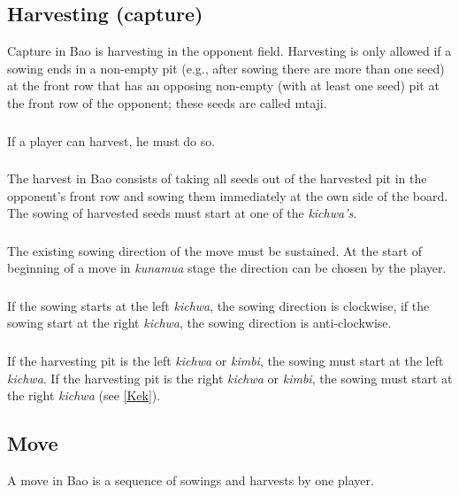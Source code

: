 \documentclass[12pt,a4paper]{article}
\begin{document}
\subsection{Harvesting (capture)}\label{Hc} 
Capture in Bao is harvesting in the opponent field. Harvesting is only allowed if a sowing ends in a non-empty pit (e.g., after sowing there are more than one seed) at the front row that has an opposing non-empty (with at least one seed) pit at the front row of the opponent; these seeds are called mtaji.

\subsubsection{}\label{Hc1}
If a player can harvest, he must do so.

\subsubsection{}\label{Hc2}
The harvest in Bao consists of taking all seeds out of the harvested pit in the opponent's front row and sowing them immediately at the own side of the board. The sowing of harvested seeds must start at one of the {\it kichwa's}.

\subsubsection{}\label{Hc3}
The existing sowing direction of the move must be sustained. At the start of beginning of a move in {\it kunamua} stage the direction can be chosen by the player.

\subsubsection{}\label{Hc4}
If the sowing starts at the left {\it kichwa}, the sowing direction is clockwise, if the sowing start at the right {\it kichwa}, the sowing direction is anti-clockwise.

\subsubsection{}\label{Hc5}
If the harvesting pit is the left {\it kichwa} or {\it kimbi}, the sowing must start at the left {\it kichwa}. If the harvesting pit is the right {\it kichwa} or {\it kimbi}, the sowing must start at the right {\it kichwa} (see \ref{Kek}).


\subsection{Move}\label{Mov} 
A move in Bao is a sequence of sowings and harvests by one player.
\end{document}
